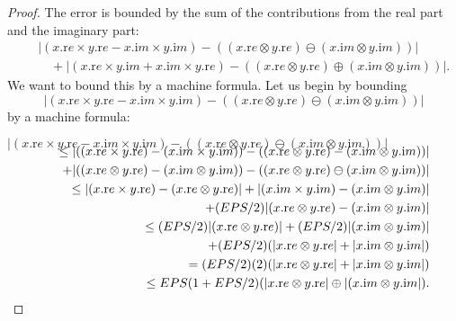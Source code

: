 \begin{proof}{}
The error is bounded by the sum of the contributions from the real part and the imaginary part:
\begin{eqnarray*}
&&|(x.{\mathrm re} \times  y.{\mathrm re} - x.{\mathrm im} \times y.{\mathrm im}) - ((x.{\mathrm re} \otimes y.{\mathrm re}) \ominus
(x.{\mathrm im}
\otimes y.{\mathrm im}))| \\[6pt]
&&\quad + |(x.{\mathrm re} \times  y.{\mathrm im} + x.{\mathrm im} \times y.{\mathrm re}) - ((x.{\mathrm re} \otimes y.{\mathrm re}) \oplus (x.{\mathrm im}
\otimes y.{\mathrm im}))|.
\end{eqnarray*}
   We want to bound this by a machine formula.  Let us begin by bounding 
$$|(x.{\mathrm re} \times  y.{\mathrm re} - x.{\mathrm im} \times y.{\mathrm im}) - ((x.{\mathrm re} \otimes y.{\mathrm re}) \ominus (x.{\mathrm im}
 \otimes y.{\mathrm im}))| $$ 
by a machine formula:\eject

\centerline{
${\displaystyle |(x.{\mathrm re} \times  y.{\mathrm re} - x.{\mathrm im} \times y.{\mathrm im}) - ((x.{\mathrm re} \otimes y.{\mathrm re}) \ominus
(x.{\mathrm im}
\otimes y.{\mathrm im}))| }$}
\begin{eqnarray*}
\noalign{\vskip-16pt}
&&\le |((x.{\mathrm re} \times  y.{\mathrm re}) - (x.{\mathrm im} \times y.{\mathrm im})) - ((x.{\mathrm re} \otimes y.{\mathrm re}) -
(x.{\mathrm im}
\otimes y.{\mathrm im}))|\\
&&\quad + |((x.{\mathrm re} \otimes y.{\mathrm re}) - (x.{\mathrm im} \otimes y.{\mathrm im}))-((x.{\mathrm re} \otimes y.{\mathrm re})
\ominus (x.{\mathrm im} \otimes y.{\mathrm im}))| \\
&&\le |(x.{\mathrm re} \times  y.{\mathrm re}) - (x.{\mathrm re} \otimes y.{\mathrm re})| + |(x.{\mathrm
im} \times y.{\mathrm im})- (x.{\mathrm im} \otimes y.{\mathrm im})| \\
&&\quad + (EPS/2)|(x.{\mathrm re} \otimes y.{\mathrm re}) - (x.{\mathrm im} \otimes
y.{\mathrm im})|\\
&&\le (EPS/2)|(x.{\mathrm re} \otimes y.{\mathrm re})| + (EPS/2)|(x.{\mathrm im} \otimes y.{\mathrm im})| \\
&&\quad + (EPS/2)(|x.{\mathrm re} \otimes
y.{\mathrm re}| + |x.{\mathrm im} \otimes y.{\mathrm im}|)\\
&&= (EPS/2)(2) (|x.{\mathrm re} \otimes y.{\mathrm re}| + |x.{\mathrm im} \otimes y.{\mathrm
im}|)\\
&&\le EPS (1 + EPS/2) (|x.{\mathrm re} \otimes y.{\mathrm re}| \oplus |(x.{\mathrm im} \otimes y.{\mathrm im}|) .
\end{eqnarray*}



\end{proof}
